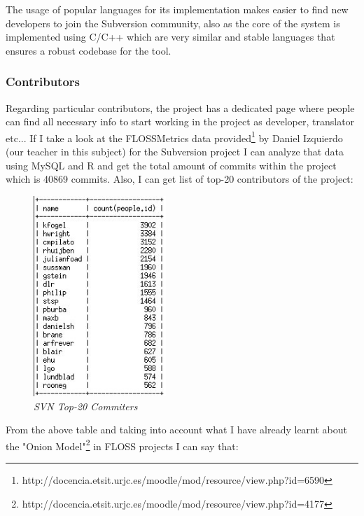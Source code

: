 \documentclass[a4paper,10pt]{article}
\begin{document}
The usage of popular languages for its implementation makes easier to find new developers to join the Subversion community, also as the core of the system is implemented using C/C++ which are very similar and stable languages that ensures a robust codebase for the tool.

\subsubsection{Contributors}

Regarding particular contributors, the project has a dedicated
page\cite{Contributors} where people can find all necessary info to start
working in the project as developer, translator etc... If I take a look at the
FLOSSMetrics data
provided\footnote{
http://docencia.etsit.urjc.es/moodle/mod/resource/view.php?id=6590} by Daniel
Izquierdo (our teacher in this subject) for the Subversion project I can analyze
that data using MySQL and R and get the total amount of commits within the
project which is 40869 commits. Also, I can get list of top-20 contributors of
the project:

\begin{figure}[H]
    \centering
    \includegraphics[width=5cm, keepaspectratio]{img/SVNcommitters.jpg}
    \caption{\textit{SVN Top-20 Commiters}}
    \label{figure:svncommitters}
 \end{figure}

From the above table and taking into account what I have already learnt about
the "Onion
Model"\footnote{
http://docencia.etsit.urjc.es/moodle/mod/resource/view.php?id=4177} in FLOSS
projects I can say that:
\end{document}
